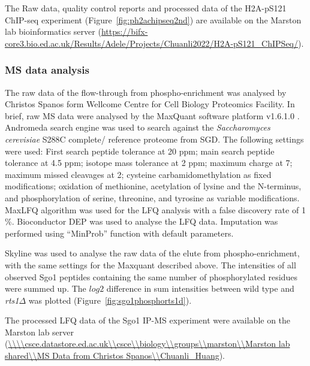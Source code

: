The Raw data, quality control reports and processed data of the H2A-pS121 ChIP-seq experiment (Figure~\ref{fig:ph2achipseq2nd}) are available on the Marston lab bioinformatics server (\url{https://bifx-core3.bio.ed.ac.uk/Results/Adele/Projects/Chuanli2022/H2A-pS121_ChIPSeq/}).

\subsubsection{MS data analysis}

The raw data of the flow-through from phospho-enrichment was analysed by Christos Spanos form Wellcome Centre for Cell Biology Proteomics Facility. In brief, raw MS data were analysed by the MaxQuant software platform v1.6.1.0 \citep{Cox2008MaxQuantQuantification}. Andromeda search engine \citep{Cox2011Andromeda:Environment} was used to search against the \textit{Saccharomyces cerevisiae} S288C complete/ reference proteome from SGD. The following settings were used: First search peptide tolerance at 20 ppm; main search peptide tolerance at 4.5 ppm; isotope mass tolerance at 2 ppm; maximum charge at 7; maximum missed cleavages at 2; cysteine carbamidomethylation as fixed modifications; oxidation of methionine, acetylation of lysine and the N-terminus, and phosphorylation of serine, threonine, and tyrosine as variable modifications. MaxLFQ algorithm \citep{Cox2014AccurateMaxLFQ} was used for the LFQ analysis with a false discovery rate of 1 \%. Bioconductor DEP \citep{Zhang2018Proteome-wideUbIA-MS} was used to analyse the LFQ data. Imputation was performed using “MinProb” function with default parameters. 

Skyline \citep{MacLean2010Skyline:Experiments} was used to analyse the raw data of the elute from phospho-enrichment, with the same settings for the Maxquant described above. The intensities of all observed Sgo1 peptides containing the same number of phosphorylated residues were summed up. The $log2$ difference in sum intensities between wild type and \textit{rts1}$\Delta$ was plotted (Figure~\ref{fig:sgo1phosphorts1d}).

The processed LFQ data of the Sgo1 IP-MS experiment were available on the Marston lab server (\url{\\\\csce.datastore.ed.ac.uk\\csce\\biology\\groups\\marston\\Marston lab shared\\MS Data from Christos Spanos\\Chuanli_Huang}). 

